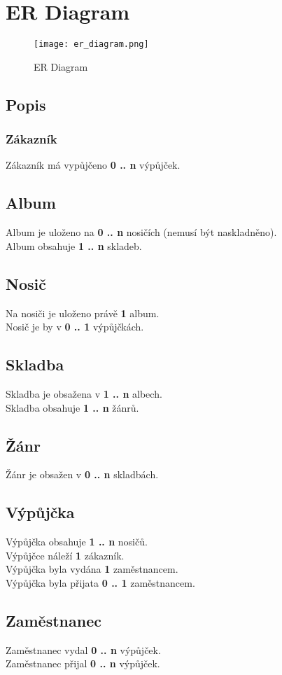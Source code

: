 \section{ER Diagram}

\begin{figure}[H] 
  \centering
  \texttt{[image: er\_diagram.png]}
  \caption{ER Diagram}
\end{figure}


\subsection{Popis}

\subsubsection{Zákazník}
Zákazník má vypůjčeno \textbf{0 .. n} výpůjček.

\subsection{Album}
Album je uloženo na \textbf{0 .. n} nosičích (nemusí být naskladněno). \\
Album obsahuje \textbf{1 .. n} skladeb.

\subsection{Nosič}
Na nosiči je uloženo právě \textbf{1} album. \\
Nosič je by v \textbf{0 .. 1} výpůjčkách.

\subsection{Skladba}
Skladba je obsažena v \textbf{1 .. n} albech. \\
Skladba obsahuje \textbf{1 .. n} žánrů.

\subsection{Žánr}
Žánr je obsažen v \textbf{0 .. n} skladbách.

\subsection{Výpůjčka}
Výpůjčka obsahuje \textbf{1 .. n} nosičů. \\
Výpůjčce náleží \textbf{1} zákazník. \\
Výpůjčka byla vydána \textbf{1} zaměstnancem. \\
Výpůjčka byla přijata \textbf{0 .. 1} zaměstnancem.

\subsection{Zaměstnanec}
Zaměstnanec vydal \textbf{0 .. n} výpůjček. \\
Zaměstnanec přijal \textbf{0 .. n} výpůjček.